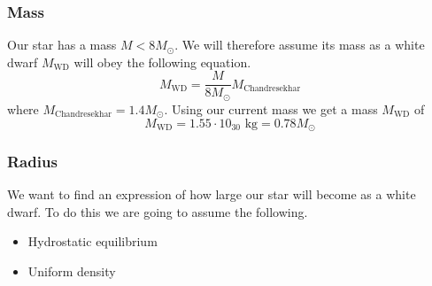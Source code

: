\documentclass[reprint,english,notitlepage]{revtex4-2}
\begin{document}
\subsubsection*{Mass}
Our star has a mass $ M < 8M_{⊙} $. We will therefore assume its mass as a white dwarf $ M_{\text{WD}} $ will obey the following equation. 
\begin{equation}\label{eq: Dwarf mass }
  M_{\text{WD}} = \frac{M}{8M_{⊙}} M_{\text{Chandresekhar}}
\end{equation}   
where $ M_{\text{Chandresekhar}} = 1.4 M_{⊙} $. 
Using our current mass we get a mass $ M_{\text{WD}} $ of
\begin{equation}\label{eq: Dwarf mass calculated }
  M_{\text{WD}} = 1.55 ⋅ 10_{30} \text{ kg} = 0.78 M_{⊙}
\end{equation}

\subsubsection*{Radius}
We want to find an expression of how large our star will become as a white dwarf. To do this we are going to assume the following. 
\begin{itemize}
  \item Hydrostatic equilibrium
  \item Uniform density
\end{itemize}
\end{document}
